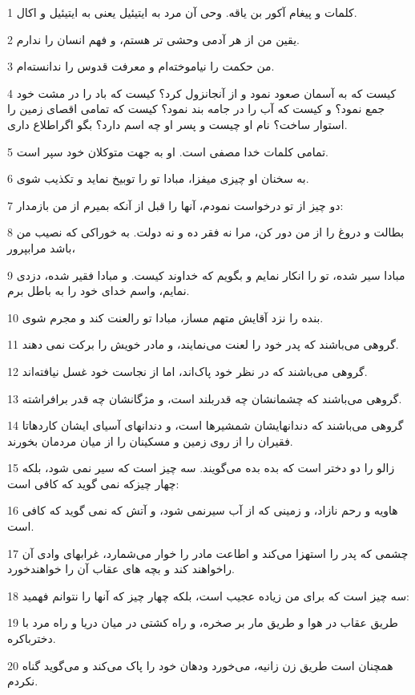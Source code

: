 \par 1 کلمات و پیغام آکور بن یاقه. وحی آن مرد به ایتیئیل یعنی به ایتیئیل و اکال.
\par 2 یقین من از هر آدمی وحشی تر هستم، و فهم انسان را ندارم.
\par 3 من حکمت را نیاموخته‌ام و معرفت قدوس را ندانسته‌ام.
\par 4 کیست که به آسمان صعود نمود و از آنجانزول کرد؟ کیست که باد را در مشت خود جمع نمود؟ و کیست که آب را در جامه بند نمود؟ کیست که تمامی اقصای زمین را استوار ساخت؟ نام او چیست و پسر او چه اسم دارد؟ بگو اگراطلاع داری.
\par 5 تمامی کلمات خدا مصفی است. او به جهت متوکلان خود سپر است.
\par 6 به سخنان او چیزی میفزا، مبادا تو را توبیخ نماید و تکذیب شوی.
\par 7 دو چیز از تو درخواست نمودم، آنها را قبل از آنکه بمیرم از من بازمدار:
\par 8 بطالت و دروغ را از من دور کن، مرا نه فقر ده و نه دولت. به خوراکی که نصیب من باشد مرابپرور،
\par 9 مبادا سیر شده، تو را انکار نمایم و بگویم که خداوند کیست. و مبادا فقیر شده، دزدی نمایم، واسم خدای خود را به باطل برم.
\par 10 بنده را نزد آقایش متهم مساز، مبادا تو رالعنت کند و مجرم شوی.
\par 11 گروهی می‌باشند که پدر خود را لعنت می‌نمایند، و مادر خویش را برکت نمی دهند.
\par 12 گروهی می‌باشند که در نظر خود پاک‌اند، اما از نجاست خود غسل نیافته‌اند.
\par 13 گروهی می‌باشند که چشمانشان چه قدربلند است، و مژگانشان چه قدر برافراشته.
\par 14 گروهی می‌باشند که دندانهایشان شمشیرها است، و دندانهای آسیای ایشان کاردهاتا فقیران را از روی زمین و مسکینان را از میان مردمان بخورند.
\par 15 زالو را دو دختر است که بده بده می‌گویند. سه چیز است که سیر نمی شود، بلکه چهار چیزکه نمی گوید که کافی است:
\par 16 هاویه و رحم نازاد، و زمینی که از آب سیرنمی شود، و آتش که نمی گوید که کافی است.
\par 17 چشمی که پدر را استهزا می‌کند و اطاعت مادر را خوار می‌شمارد، غرابهای وادی آن راخواهند کند و بچه های عقاب آن را خواهندخورد.
\par 18 سه چیز است که برای من زیاده عجیب است، بلکه چهار چیز که آنها را نتوانم فهمید:
\par 19 طریق عقاب در هوا و طریق مار بر صخره، و راه کشتی در میان دریا و راه مرد با دخترباکره.
\par 20 همچنان است طریق زن زانیه، می‌خورد ودهان خود را پاک می‌کند و می‌گوید گناه نکردم.
